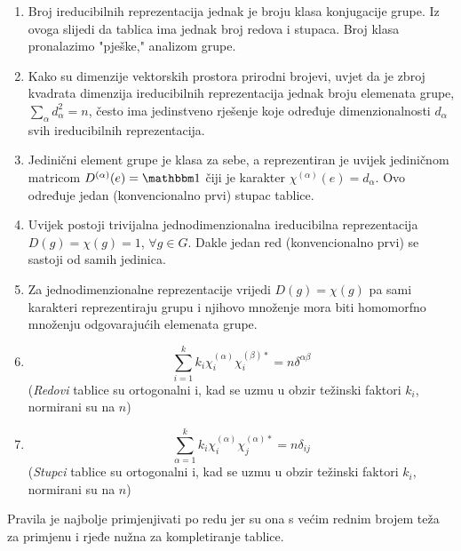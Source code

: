 \begin{enumerate}

\item Broj ireducibilnih reprezentacija jednak je broju klasa konjugacije 
  grupe. Iz ovoga slijedi da tablica ima jednak broj redova i stupaca. 
  Broj klasa pronalazimo "pješke," analizom grupe.

\item Kako su dimenzije vektorskih prostora prirodni brojevi,
    uvjet da je zbroj kvadrata dimenzija ireducibilnih reprezentacija
    jednak broju elemenata grupe, $\sum_{\alpha} d_{\alpha}^2 = n$, često ima jedinstveno rješenje koje
    određuje dimenzionalnosti $d_{\alpha}$ svih ireducibilnih reprezentacija.

\item Jedinični element grupe je klasa za sebe, a reprezentiran je uvijek
  jediničnom matricom $D^{(\alpha)}(e)=\Eins$ čiji je 
   karakter $\chi^{(\alpha)}(e)=d_{\alpha}$.
  Ovo određuje jedan (konvencionalno prvi) stupac tablice.

\item Uvijek postoji trivijalna jednodimenzionalna ireducibilna
   reprezentacija  $D(g)=\chi(g)=1$, $\forall g\in G$.
  Dakle jedan red (konvencionalno prvi) se sastoji od samih jedinica.

\item Za jednodimenzionalne reprezentacije vrijedi $D(g)=\chi(g)$ pa
  sami karakteri reprezentiraju grupu i njihovo množenje mora biti
  homomorfno množenju odgovarajućih elemenata grupe.

\item  \[\sum_{i=1}^{k} k_{i} \chi^{(\alpha)}_{i} \chi^{(\beta) *}_{i} =
    n \delta^{\alpha\beta}\] 
(\emph{Redovi} tablice su ortogonalni i, kad se uzmu u obzir težinski
  faktori $k_i$, normirani su na $n$)

\item  \[\sum_{\alpha=1}^{k} k_{i} \chi^{(\alpha)}_{i} \chi^{(\alpha) *}_{j} =
    n \delta_{ij} \] 
(\emph{Stupci} tablice su ortogonalni i, kad se uzmu u obzir težinski
  faktori $k_i$, normirani su na $n$)

\end{enumerate}

Pravila je najbolje primjenjivati po redu jer su ona s većim rednim
brojem teža za primjenu i rjeđe nužna za kompletiranje tablice.


